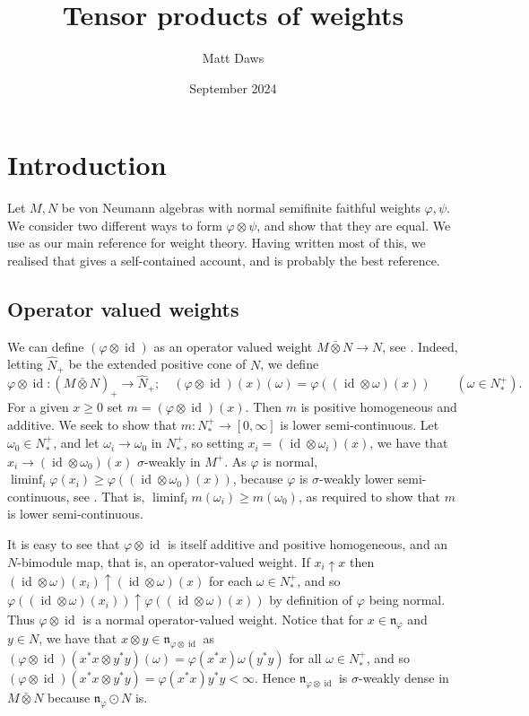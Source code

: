 \documentclass[a4paper,11pt]{article}
\theoremstyle{plain}
\theoremstyle{remark}
\newcommand{\mf}[1]{\mathfrak{#1}}
\newcommand{\id}{\operatorname{id}}
\newcommand{\vnten}{\bar\otimes}
\newcommand{\hh}{\widehat}
\begin{document}
\title{Tensor products of weights}
\author{Matt Daws}
\date{September 2024}
\maketitle

\section{Introduction}

Let $M,N$ be von Neumann algebras with normal semifinite faithful weights $\varphi,\psi$.  We consider two different ways to form $\varphi\otimes\psi$, and show that they are equal.  We use \cite{TakesakiII} as our main reference for weight theory.  Having written most of this, we realised that \cite[Section~4]{Stratila_ModTheoryBook} gives a self-contained account, and is probably the best reference.


\subsection{Operator valued weights}\label{sec:opvalweight}

We can define $(\varphi\otimes\id)$ as an operator valued weight $M\vnten N \to N$, see \cite[Chapter~IX, Section~4]{TakesakiII}.  Indeed, letting $\hh N_+$ be the extended positive cone of $N$, we define
\[ \varphi\otimes\id \colon (M\vnten N)_+ \to \hh N_+; \quad
(\varphi\otimes\id)(x)(\omega) = \varphi((\id\otimes\omega)(x)) \qquad (\omega \in N_*^+). \]
For a given $x\geq 0$ set $m = (\varphi\otimes\id)(x)$.  Then $m$ is positive homogeneous and additive.  We seek to show that $m \colon N_*^+ \to [0,\infty]$ is lower semi-continuous.  Let $\omega_0 \in N_*^+$, and let $\omega_i \to \omega_0$ in $N_*^+$, so setting $x_i = (\id\otimes\omega_i)(x)$, we have that $x_i \to (\id\otimes\omega_0)(x)$ $\sigma$-weakly in $M^+$.  As $\varphi$ is normal, $\liminf_i \varphi(x_i) \geq \varphi((\id\otimes\omega_0)(x))$, because $\varphi$ is $\sigma$-weakly lower semi-continuous, see \cite[Theorem~VII.1.11]{TakesakiII}.  That is, $\liminf_i m(\omega_i) \geq m(\omega_0)$, as required to show that $m$ is lower semi-continuous.

It is easy to see that $\varphi\otimes\id$ is itself additive and positive homogeneous, and an $N$-bimodule map, that is, an operator-valued weight.  If $x_i \uparrow x$ then $(\id\otimes\omega)(x_i) \uparrow (\id\otimes\omega)(x)$ for each $\omega\in N_*^+$, and so $\varphi((\id\otimes\omega)(x_i)) \uparrow \varphi((\id\otimes\omega)(x))$ by definition of $\varphi$ being normal.  Thus $\varphi\otimes\id$ is a normal operator-valued weight.  Notice that for $x\in\mf n_\varphi$ and $y\in N$, we have that $x \otimes y \in \mf n_{\varphi\otimes\id}$ as $(\varphi\otimes\id)(x^*x\otimes y^*y)(\omega) = \varphi(x^*x) \omega(y^*y)$ for all $\omega\in N_*^+$, and so $(\varphi\otimes\id)(x^*x\otimes y^*y) = \varphi(x^*x) y^*y < \infty$.  Hence $\mf n_{\varphi\otimes\id}$ is $\sigma$-weakly dense in $M\vnten N$ because $\mf n_\varphi \odot N$ is.
\end{document}
